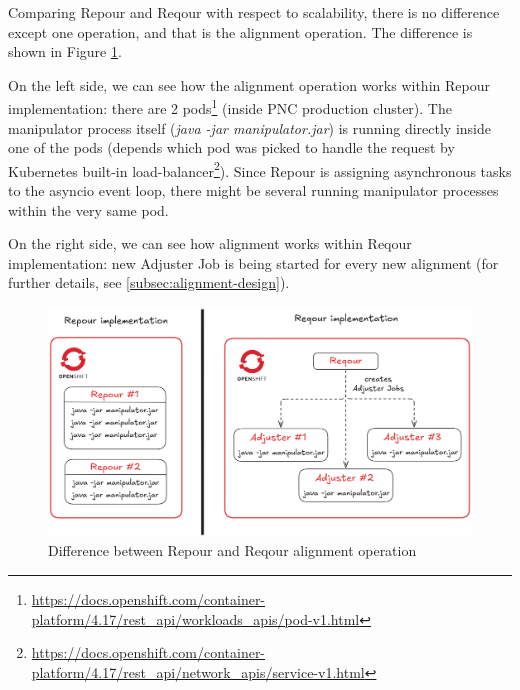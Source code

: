 \documentclass[../main.tex]{subfiles}
\begin{document}
Comparing Repour and Reqour with respect to scalability, there is no difference except one operation, and that is the alignment operation. The difference is shown in Figure \ref{fig:scalability}.

On the left side, we can see how the alignment operation works within Repour implementation: there are 2 pods\footnote{\url{https://docs.openshift.com/container-platform/4.17/rest_api/workloads_apis/pod-v1.html}} (inside PNC production cluster). The manipulator process itself (\textit{java -jar manipulator.jar}) is running directly inside one of the pods (depends which pod was picked to handle the request by Kubernetes built-in load-balancer\footnote{\url{https://docs.openshift.com/container-platform/4.17/rest_api/network_apis/service-v1.html}}). Since Repour is assigning asynchronous tasks to the asyncio event loop, there might be several running manipulator processes within the very same pod.

On the right side, we can see how alignment works within Reqour implementation: new Adjuster Job is being started for every new alignment (for further details, see \ref{subsec:alignment-design}).

\begin{figure}
  \begin{center}
    \includegraphics[width=\textwidth]{images/scalability.png}
  \end{center}
  \caption{Difference between Repour and Reqour alignment operation}
  \label{fig:scalability}
\end{figure}
\end{document}
